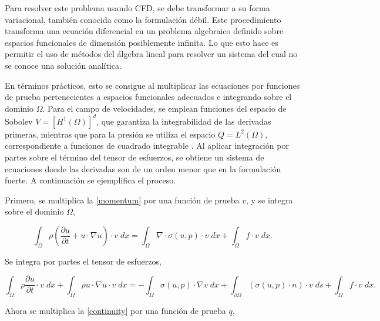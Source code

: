 \documentclass[12pt, letterpaper]{article}
\begin{document}
Para resolver este problema usando CFD, se debe transformar a su forma variacional, también conocida como la formulación débil. Este procedimiento transforma una ecuación diferencial en un problema algebraico definido sobre espacios funcionales de dimensión posiblemente infinita. Lo que esto hace es permitir el uso de métodos del álgebra lineal para resolver un sistema del cual no se conoce una solución analítica.

En términos prácticos, esto se consigue al multiplicar las ecuaciones por funciones de prueba pertenecientes a espacios funcionales adecuados e integrando sobre el dominio $\Omega$. Para el campo de velocidades, se emplean funciones del espacio de Sobolev $V = [H^1(\Omega)]^d$, que garantiza la integrabilidad de las derivadas primeras, mientras que para la presión se utiliza el espacio $Q = L^2(\Omega)$, correspondiente a funciones de cuadrado integrable \cite{teoria-ns}. Al aplicar integración por partes sobre el término del tensor de esfuerzos, se obtiene un sistema de ecuaciones donde las derivadas son de un orden menor que en la formulación fuerte. A continuación se ejemplifica el proceso.

Primero, se multiplica la \cref{momentum} por una función de prueba $v$, y se integra sobre el dominio $\Omega$,

\begin{center}
  \begin{equation*}
    \int_{\Omega}\rho(\frac{\partial u}{\partial t} + u \cdot \nabla u) \cdot v \; dx = \int_{\Omega}\nabla \cdot \sigma(u,p) \cdot v \; dx + \int_{\Omega}f \cdot v \; dx.
  \end{equation*}
\end{center}
\vspace{6pt}

Se integra por partes el tensor de esfuerzos,

\begin{center}
  \begin{equation}
    \label{momentum_weak}
    \int_{\Omega}\rho\frac{\partial u}{\partial t}\cdot v \; dx + \int_{\Omega} \rho u \cdot \nabla u \cdot v \; dx = -\int_{\Omega}\sigma(u,p) \cdot \nabla v \; dx + \int_{\partial \Omega}(\sigma(u,p) \cdot n) \cdot v \; ds + \int_{\Omega}f \cdot v \; dx.
  \end{equation}
\end{center}
\vspace{6pt}

Ahora se multiplica la \cref{continuity} por una función de prueba $q$,
\end{document}
